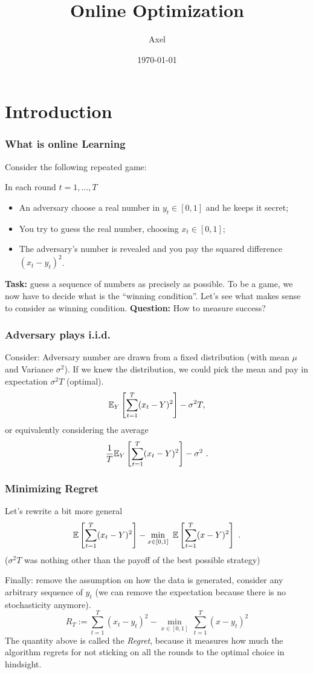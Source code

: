 \documentclass{beamer}
\title{Online Optimization}
\author{Axel}
\date{\today}
\begin{document}
\maketitle
\frame{\tableofcontents[currentsection]}

\section{Introduction}

\begin{frame}
  \frametitle{What is online Learning}
Consider the following repeated game:

In each round $t=1,\dots,T$
\begin{itemize}
  \item An adversary choose a real number in $y_t \in [0,1]$ and he keeps it secret;
  \item You try to guess the real number, choosing $x_t \in [0,1]$;
  \item The adversary's number is revealed and you pay the squared difference ${(x_t-y_t)}^2$.
\end{itemize}
\textbf{Task:} guess a sequence of numbers as precisely as possible.
To be a game, we now have to decide what is the ``winning condition''. Let's see what makes sense to consider as winning condition.
\textbf{Question:} How to measure success?
\end{frame}


\begin{frame}
  \frametitle{Adversary plays i.i.d.}
  Consider: Adversary number are drawn from a fixed distribution (with mean $\mu$ and Variance $\sigma^2$).
  If we knew the distribution, we could pick the mean and pay in expectation $\sigma^2T$ (optimal).
  \begin{equation}
    \label{eq:stoch_regret}
    \mathbb{E}_Y\left[\sum_{t=1}^T (x_t - Y)^2\right] - \sigma^2 T,
  \end{equation}
  or equivalently considering the average
  \begin{equation}
    \label{eq:av_stoch_regret}
    \frac{1}{T}\mathbb{E}_Y\left[\sum_{t=1}^T (x_t - Y)^2\right] - \sigma^2~.
  \end{equation}
\end{frame}


\begin{frame}
  \frametitle{Minimizing Regret}
  Let's rewrite a bit more general
  \[
    \mathbb{E}\left[\sum_{t=1}^T (x_t - Y)^2\right] - \min_{ x \in [0,1]} \ \mathbb{E}\left[\sum_{t=1}^T (x-Y)^2\right]~.
  \]
  ($\sigma^2T$ was nothing other than the payoff of the best possible strategy)

  Finally: remove the assumption on how the data is generated, consider any arbitrary sequence of $y_t$ (we can remove the expectation because there is no stochasticity anymore).
  \[
    R_T:=\sum_{t=1}^T (x_t - y_t)^2 - \min_{x \in [0,1]} \ \sum_{t=1}^T (x - y_t)^2
  \]
  The quantity above is called the \emph{Regret}, because it measures how much the algorithm regrets for not sticking on all the rounds to the optimal choice in hindsight.
\end{frame}
\end{document}
